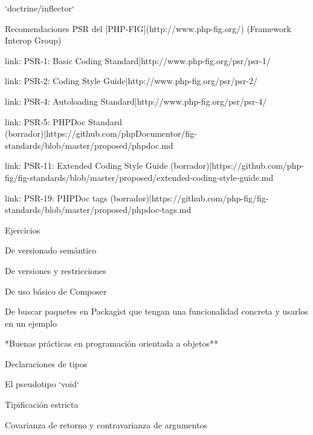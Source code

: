 \begin{longenum}
\begin{longenum}
\begin{longenum}
            \item `doctrine/inflector`
        \end{longenum}
        \item Recomendaciones PSR del [PHP-FIG](http://www.php-fig.org/) (Framework Interop Group)
        \begin{longenum}
            \item [link: PSR-1: Basic Coding Standard|http://www.php-fig.org/psr/psr-1/]
            \item [link: PSR-2: Coding Style Guide|http://www.php-fig.org/psr/psr-2/]
            \item [link: PSR-4: Autoloading Standard|http://www.php-fig.org/psr/psr-4/]
            \item [link: PSR-5: PHPDoc Standard (borrador)|https://github.com/phpDocumentor/fig-standards/blob/master/proposed/phpdoc.md]
            \item [link: PSR-11: Extended Coding Style Guide (borrador)|https://github.com/php-fig/fig-standards/blob/master/proposed/extended-coding-style-guide.md]
            \item [link: PSR-19: PHPDoc tags (borrador)|https://github.com/php-fig/fig-standards/blob/master/proposed/phpdoc-tags.md]
        \end{longenum}
        \item Ejercicios
        \begin{longenum}
            \item De versionado semántico
            \item De versiones y restricciones
            \item De uso básico de Composer
            \item De buscar paquetes en Packagist que tengan una funcionalidad concreta y usarlos en un ejemplo
        \end{longenum}
    \end{longenum}
    \item **Buenas prácticas en programación orientada a objetos**
    \begin{longenum}
        \item Declaraciones de tipos
        \begin{longenum}
            \item El pseudotipo `void`
            \item Tipificación estricta
            \item Covarianza de retorno y contravarianza de argumentos
        \end{longenum}

\end{longenum}
\end{longenum}
